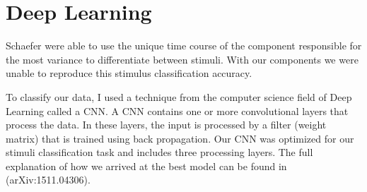 \chapter{Deep Learning}
Schaefer \etal \citeyear{schaefer_name_2011} were able to use the unique time course of the component responsible for the most variance to differentiate between stimuli.
With our components we were unable to reproduce this stimulus classification accuracy. 
 
To classify our data, I used a technique from the computer science field of Deep Learning called a \ac{CNN}.
A \ac{CNN} contains one or more convolutional layers that process the data.
In these layers, the input is processed by a filter (weight matrix) that is trained using back propagation. 
Our \ac{CNN} was optimized for our stimuli classification task and includes three processing layers.
The full explanation of how we arrived at the best model can be found in \cite{stober_ICLR2016} (arXiv:1511.04306).


